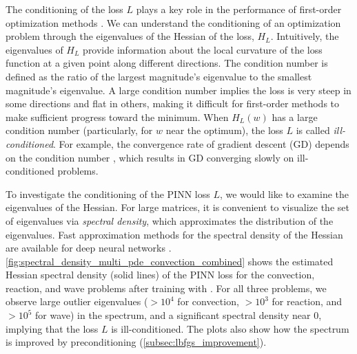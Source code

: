 The conditioning of the loss $L$ plays a key role in the performance of first-order optimization methods \cite{nesterov2018lectures}.
We can understand the conditioning of an optimization problem through the eigenvalues of the Hessian of the loss, $H_L$. 
Intuitively, the eigenvalues of $H_L$ provide information about the local curvature of the loss function at a given point along different directions. 
The condition number is defined as the ratio of the largest magnitude's eigenvalue to the smallest magnitude's eigenvalue.
A large condition number implies the loss is very steep in some directions and flat in others, making it difficult for first-order methods to make sufficient progress toward the minimum. 
When $H_L(w)$ has a large condition number (particularly, for $w$ near the optimum), the loss $L$ is called \emph{ill-conditioned}.
For example, the convergence rate of gradient descent (GD) depends on the condition number \cite{nesterov2018lectures}, which results in GD converging slowly on ill-conditioned problems.


To investigate the conditioning of the PINN loss $L$, 
we would like to examine the eigenvalues of the Hessian. 
For large matrices, it is convenient to visualize the set of eigenvalues via  \emph{spectral density}, which approximates the distribution of the eigenvalues.
Fast approximation methods for the spectral density of the Hessian are available for deep neural networks \cite{ghorbani2019an, yao2020pyhessian}. 
\cref{fig:spectral_density_multi_pde_convection_combined} shows the estimated Hessian spectral density (solid lines) of the PINN loss for the convection, reaction, and wave problems after training with \al{}. 
For all three problems, we observe large outlier eigenvalues ($> 10^4$ for convection, $> 10^3$ for reaction, and $> 10^5$ for wave) in the spectrum, and a significant spectral density near $0$, implying that the loss $L$ is ill-conditioned.
The plots also show how the spectrum is improved by preconditioning (\cref{subsec:lbfgs_improvement}).

